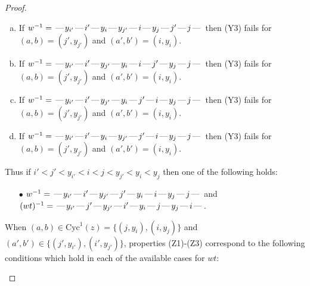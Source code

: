 \documentclass[10pt]{article}
\theoremstyle{definition}
\theoremstyle{definition}
\def\dash{\text{\hspace{0.5mm}---\hspace{0.5mm}}}
\def\Cyc{\mathrm{Cyc}}
\begin{document}
\begin{proof}
\begin{enumerate}
\begin{enumerate}[(a)]
\item If $w^{-1} = \dash y_{i'}\dash i'\dash y_i\dash y_{j'}\dash i\dash y_j\dash j'\dash j\dash $ then (Y3) fails for $(a,b)=(j',y_{j'})$ and $(a',b')=(i,y_i)$.
\item If $w^{-1} = \dash y_{i'}\dash i'\dash y_{j'}\dash y_i\dash i\dash j'\dash y_j\dash j\dash $ then (Y3) fails for $(a,b)=(j',y_{j'})$ and $(a',b')=(i,y_i)$.
\item If $w^{-1} = \dash y_{i'}\dash i'\dash y_{j'}\dash y_i\dash j'\dash i\dash y_j\dash j\dash $ then (Y3) fails for $(a,b)=(j',y_{j'})$ and $(a',b')=(i,y_i)$.
\item If $w^{-1} = \dash y_{i'}\dash i'\dash y_i\dash y_{j'}\dash j'\dash i\dash y_j\dash j\dash $ then (Y3) fails for $(a,b)=(j',y_{j'})$ and $(a',b')=(i,y_i)$.
\end{enumerate}
Thus if $i' < j' < y_{i'} < i < j < y_{j'} < y_i < y_j$ then one of the following holds:
\begin{enumerate}
\item[$\bullet$] $w^{-1} = \dash y_{i'}\dash i'\dash y_{j'}\dash j'\dash y_i\dash i\dash y_j\dash j\dash $ and $(wt)^{-1} = \dash y_{i'}\dash j'\dash y_{j'}\dash i'\dash y_i\dash j\dash y_j\dash i\dash $.
\end{enumerate}
When $(a,b)\in\Cyc^1(z)=\{(j,y_i),(i,y_j)\}$ and $(a',b')\in\{(j',y_{i'}),(i',y_{j'})\}$,
properties (Z1)-(Z3) correspond to the following conditions which
hold in each of the available cases for $wt$:
\end{enumerate}
\end{proof}
\end{document}
